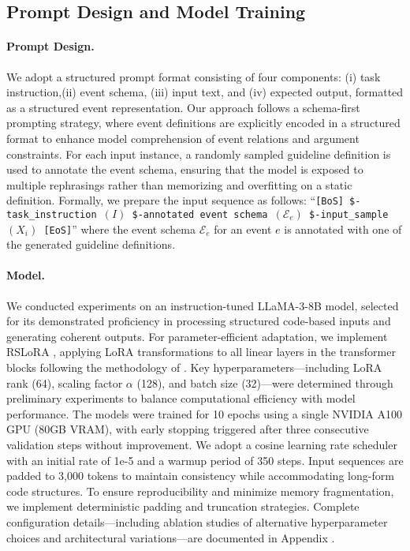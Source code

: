 \subsection{Prompt Design and Model Training}

\paragraph{Prompt Design.}
We adopt a structured prompt format consisting of four components: (i) task instruction,(ii) event schema, (iii) input text, and (iv) expected output, formatted as a structured event representation. Our approach follows a schema-first prompting strategy, where event definitions are explicitly encoded in a structured format to enhance model comprehension of event relations and argument constraints. For each input instance, a randomly sampled guideline definition is used to annotate the event schema, ensuring that the model is exposed to multiple rephrasings rather than memorizing and overfitting on a static definition. Formally, we prepare the input sequence as follows: ``\texttt{[BoS] \$-task\_instruction $(I)$ \$-annotated event schema $(\mathcal{E}_e)$~\$-input\_sample~$(X_i)$~[EoS]}'' where  the event schema $\mathcal{E}_e$ for an event $e$ is annotated with one of the generated guideline definitions.
\paragraph{Model.} 
We conducted experiments on an instruction-tuned LLaMA-3-8B model, selected for its demonstrated proficiency in processing structured code-based inputs and generating coherent outputs. For parameter-efficient adaptation, we implement RSLoRA \cite{RSLORA}, applying LoRA transformations to all linear layers in the transformer blocks following the methodology of \citet{xe}. Key hyperparameters—including LoRA rank (64), scaling factor $\alpha$ (128), and batch size (32)—were determined through preliminary experiments to balance computational efficiency with model performance. The models were trained for 10 epochs using a single NVIDIA A100 GPU (80GB VRAM), with early stopping triggered after three consecutive validation steps without improvement. We adopt a cosine learning rate scheduler with an initial rate of 1e-5 and a warmup period of 350 steps. Input sequences are padded to 3,000 tokens to maintain consistency while accommodating long-form code structures. To ensure reproducibility and minimize memory fragmentation, we implement deterministic padding and truncation strategies. Complete configuration details—including ablation studies of alternative hyperparameter choices and architectural variations—are documented in Appendix .

